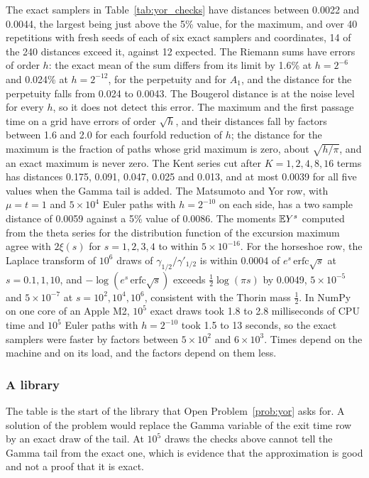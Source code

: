 The exact samplers in Table~\ref{tab:yor_checks} have distances between 0.0022 and 0.0044, the largest being just above the 5\% value, for the maximum, and over 40 repetitions with fresh seeds of each of six exact samplers and coordinates, 14 of the 240 distances exceed it, against 12 expected. The Riemann sums have errors of order $h$: the exact mean of the sum differs from its limit by 1.6\% at $h=2^{-6}$ and 0.024\% at $h=2^{-12}$, for the perpetuity and for $A_1$, and the distance for the perpetuity falls from 0.024 to 0.0043. The Bougerol distance is at the noise level for every $h$, so it does not detect this error. The maximum and the first passage time on a grid have errors of order $\sqrt h$, and their distances fall by factors between 1.6 and 2.0 for each fourfold reduction of $h$; the distance for the maximum is the fraction of paths whose grid maximum is zero, about $\sqrt{h/\pi}$, and an exact maximum is never zero. The Kent series cut after $K=1,2,4,8,16$ terms has distances 0.175, 0.091, 0.047, 0.025 and 0.013, and at most 0.0039 for all five values when the Gamma tail is added. The Matsumoto and Yor row, with $\mu=t=1$ and $5\times10^4$ Euler paths with $h=2^{-10}$ on each side, has a two sample distance of 0.0059 against a 5\% value of 0.0086. The moments $\mathbb{E} Y^s$ computed from the theta series for the distribution function of the excursion maximum agree with $2\xi(s)$ for $s=1,2,3,4$ to within $5\times10^{-16}$. For the horseshoe row, the Laplace transform of $10^6$ draws of $\gamma_{1/2}/\gamma'_{1/2}$ is within 0.0004 of $e^s\,\mathrm{erfc}\sqrt s$ at $s=0.1,1,10$, and $-\log(e^s\,\mathrm{erfc}\sqrt s)$ exceeds $\frac12\log(\pi s)$ by 0.0049, $5\times10^{-5}$ and $5\times10^{-7}$ at $s=10^2,10^4,10^6$, consistent with the Thorin mass $\frac12$. In NumPy on one core of an Apple M2, $10^5$ exact draws took 1.8 to 2.8 milliseconds of CPU time and $10^5$ Euler paths with $h=2^{-10}$ took 1.5 to 13 seconds, so the exact samplers were faster by factors between $5\times10^2$ and $6\times10^3$. Times depend on the machine and on its load, and the factors depend on them less.

\subsubsection{A library} The table is the start of the library that Open Problem~\ref{prob:yor} asks for. A solution of the problem would replace the Gamma variable of the exit time row by an exact draw of the tail. At $10^5$ draws the checks above cannot tell the Gamma tail from the exact one, which is evidence that the approximation is good and not a proof that it is exact.
